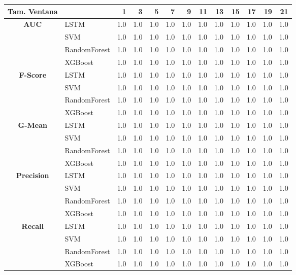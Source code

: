 \begin{table}[h]
	\centering
	\begin{adjustbox}{max width=11cm}
		\begin{tabular}{|c|l|r|r|r|r|r|r|r|r|r|r|r|}
			\hline
			\textbf{Tam. Ventana}&         &   1  &   3  &   5  &   7  &   9  &   11 &   13 &   15 &   17 &   19 &   21 \\
			\hline
			\textbf{AUC} & LSTM &  1.0 &  1.0 &  1.0 &  1.0 &  1.0 &  1.0 &  1.0 &  1.0 &  1.0 &  1.0 &  1.0 \\
			& SVM &  1.0 &  1.0 &  1.0 &  1.0 &  1.0 &  1.0 &  1.0 &  1.0 &  1.0 &  1.0 &  1.0 \\
			& RandomForest &  1.0 &  1.0 &  1.0 &  1.0 &  1.0 &  1.0 &  1.0 &  1.0 &  1.0 &  1.0 &  1.0 \\
			& XGBoost &  1.0 &  1.0 &  1.0 &  1.0 &  1.0 &  1.0 &  1.0 &  1.0 &  1.0 &  1.0 &  1.0 \\
			\hline
			\textbf{F-Score} & LSTM &  1.0 &  1.0 &  1.0 &  1.0 &  1.0 &  1.0 &  1.0 &  1.0 &  1.0 &  1.0 &  1.0 \\
			& SVM &  1.0 &  1.0 &  1.0 &  1.0 &  1.0 &  1.0 &  1.0 &  1.0 &  1.0 &  1.0 &  1.0 \\
			& RandomForest &  1.0 &  1.0 &  1.0 &  1.0 &  1.0 &  1.0 &  1.0 &  1.0 &  1.0 &  1.0 &  1.0 \\
			& XGBoost &  1.0 &  1.0 &  1.0 &  1.0 &  1.0 &  1.0 &  1.0 &  1.0 &  1.0 &  1.0 &  1.0 \\
			\hline
			\textbf{G-Mean} & LSTM &  1.0 &  1.0 &  1.0 &  1.0 &  1.0 &  1.0 &  1.0 &  1.0 &  1.0 &  1.0 &  1.0 \\
			& SVM &  1.0 &  1.0 &  1.0 &  1.0 &  1.0 &  1.0 &  1.0 &  1.0 &  1.0 &  1.0 &  1.0 \\
			& RandomForest &  1.0 &  1.0 &  1.0 &  1.0 &  1.0 &  1.0 &  1.0 &  1.0 &  1.0 &  1.0 &  1.0 \\
			& XGBoost &  1.0 &  1.0 &  1.0 &  1.0 &  1.0 &  1.0 &  1.0 &  1.0 &  1.0 &  1.0 &  1.0 \\
			\hline
			\textbf{Precision} & LSTM &  1.0 &  1.0 &  1.0 &  1.0 &  1.0 &  1.0 &  1.0 &  1.0 &  1.0 &  1.0 &  1.0 \\
			& SVM &  1.0 &  1.0 &  1.0 &  1.0 &  1.0 &  1.0 &  1.0 &  1.0 &  1.0 &  1.0 &  1.0 \\
			& RandomForest &  1.0 &  1.0 &  1.0 &  1.0 &  1.0 &  1.0 &  1.0 &  1.0 &  1.0 &  1.0 &  1.0 \\
			& XGBoost &  1.0 &  1.0 &  1.0 &  1.0 &  1.0 &  1.0 &  1.0 &  1.0 &  1.0 &  1.0 &  1.0 \\
			\hline
			\textbf{Recall} & LSTM &  1.0 &  1.0 &  1.0 &  1.0 &  1.0 &  1.0 &  1.0 &  1.0 &  1.0 &  1.0 &  1.0 \\
			& SVM &  1.0 &  1.0 &  1.0 &  1.0 &  1.0 &  1.0 &  1.0 &  1.0 &  1.0 &  1.0 &  1.0 \\
			& RandomForest &  1.0 &  1.0 &  1.0 &  1.0 &  1.0 &  1.0 &  1.0 &  1.0 &  1.0 &  1.0 &  1.0 \\
			& XGBoost &  1.0 &  1.0 &  1.0 &  1.0 &  1.0 &  1.0 &  1.0 &  1.0 &  1.0 &  1.0 &  1.0 \\
			\hline
			

\end{tabular}
\end{adjustbox}
\end{table}
